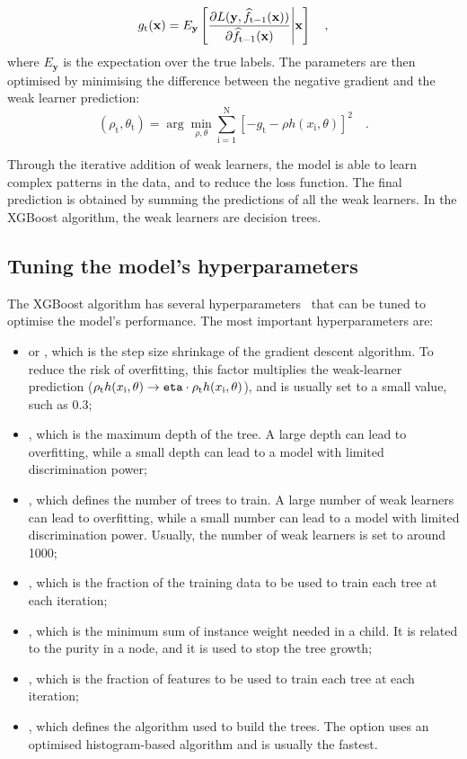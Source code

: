 \begin{equation*}
    g_\mathrm{t}(\mathbf{x}) = E_{\mathbf{y}}\left[ \frac{\partial L(\mathbf{y},\widehat{f}_{\mathrm{t}-1}(\mathbf{x}))}{\partial \widehat{f}_{\mathrm{t}-1}(\mathbf{x})} \Bigg{|} \mathbf{x} \right] \quad ,
\end{equation*}
where $E_{\mathbf{y}}$ is the expectation over the true labels. The parameters are then optimised by minimising the difference between the negative gradient and the weak learner prediction:
\begin{equation*}
    (\rho_\mathrm{t}, \theta_\mathrm{t}) = \arg\min_{\rho,\theta} \sum_{\mathrm{i}=1}^{\mathrm{N}} \left[-g_\mathrm{t} - \rho h(x_\mathrm{i},\theta)\right]^{2}\quad .
\end{equation*}

Through the iterative addition of weak learners, the model is able to learn complex patterns in the data, and to reduce the loss function. The final prediction is obtained by summing the predictions of all the weak learners. In the XGBoost algorithm, the weak learners are decision trees.

\subsection{Tuning the model's hyperparameters}
The XGBoost algorithm has several hyperparameters~\cite{XGBoost_parameters} that can be tuned to optimise the model's performance. The most important hyperparameters are:
\begin{itemize}
    \item {} or , which is the step size shrinkage of the gradient descent algorithm. To reduce the risk of overfitting, this factor multiplies the weak-learner prediction ($\rho_\mathrm{t} h(x_\mathrm{i},\theta) \rightarrow \texttt{eta} \cdot \rho_\mathrm{t} h(x_\mathrm{i},\theta)$), and is usually set to a small value, such as 0.3;
    \item {}, which is the maximum depth of the tree. A large depth can lead to overfitting, while a small depth can lead to a model with limited discrimination power;
    \item {}, which defines the number of trees to train. A large number of weak learners can lead to overfitting, while a small number can lead to a model with limited discrimination power. Usually, the number of weak learners is set to around 1000;
    \item {}, which is the fraction of the training data to be used to train each tree at each iteration;
    \item {}, which is the minimum sum of instance weight needed in a child. It is related to the purity in a node, and it is used to stop the tree growth;
    \item {}, which is the fraction of features to be used to train each tree at each iteration;
    \item {}, which defines the algorithm used to build the trees. The  option uses an optimised histogram-based algorithm and is usually the fastest.
\end{itemize}

